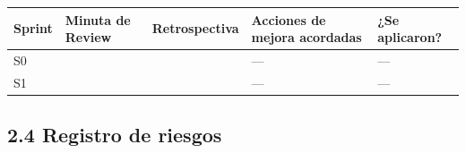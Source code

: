 {\def\LTcaptype{none} %
\begin{longtable}[]{@{}
  >{\raggedright\arraybackslash}p{}
  >{\raggedright\arraybackslash}p{}
  >{\raggedright\arraybackslash}p{}
  >{\raggedright\arraybackslash}p{}
  >{\raggedright\arraybackslash}p{}@{}}
\toprule\noalign{}
\begin{minipage}[b]{\linewidth}\raggedright
\textbf{Sprint}
\end{minipage} & \begin{minipage}[b]{\linewidth}\raggedright
\textbf{Minuta de Review}
\end{minipage} & \begin{minipage}[b]{\linewidth}\raggedright
\textbf{Retrospectiva}
\end{minipage} & \begin{minipage}[b]{\linewidth}\raggedright
\textbf{Acciones de mejora acordadas}
\end{minipage} & \begin{minipage}[b]{\linewidth}\raggedright
\textbf{¿Se aplicaron?}
\end{minipage} \\
\midrule\noalign{}
\endhead
\bottomrule\noalign{}
\endlastfoot
S0 & \pendiente{} & \pendiente{} & --- & --- \\
S1 & \pendiente{} & \pendiente{} & --- & --- \\
\end{longtable}
}

\subsection{2.4 Registro de riesgos}\label{registro-de-riesgos}

